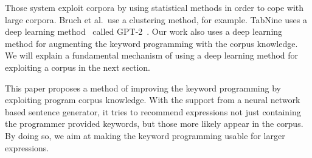 \documentclass[PRO,english]{ipsj}
\begin{document}



Those system exploit corpora by using statistical methods in order to cope with large corpora.  Bruch et al.\ use a clustering method, for example.  TabNine uses a deep learning method~\cite{deep-tabnine2019} called GPT-2~\cite{radford2019language}.  Our work also uses a deep learning method for augmenting the keyword programming with the corpus knowledge.  We will explain a fundamental mechanism of using a deep learning method for exploiting a corpus in the next section.






This paper proposes a method of improving the keyword programming by exploiting program corpus knowledge.  With the support from a neural network based sentence generator, it tries to recommend expressions not just containing the programmer provided keywords, but those more likely appear in the corpus.  By doing so, we aim at making the keyword programming usable for larger expressions.  
\end{document}
